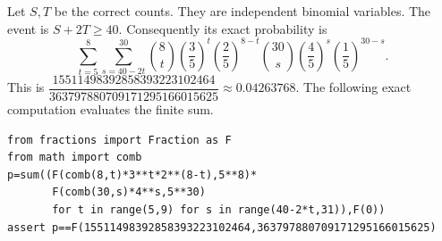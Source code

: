 Let $ S,T $ be the correct counts. They are independent binomial variables. The event is $ S+2T\ge40 $. Consequently its exact probability is \[\sum_{t=5}^{8}\sum_{s=40-2t}^{30}\binom8t\left(\dfrac{3}{5}\right)^t\left(\dfrac{2}{5}\right)^{8-t}\binom{30}s\left(\dfrac{4}{5}\right)^s\left(\dfrac{1}{5}\right)^{30-s}.\]This is $\boxed{\dfrac{15511498392858393223102464}{363797880709171295166015625}}\approx0.04263768 $. The following exact computation evaluates the finite sum.
\begin{verbatim}
from fractions import Fraction as F
from math import comb
p=sum((F(comb(8,t)*3**t*2**(8-t),5**8)*
       F(comb(30,s)*4**s,5**30)
       for t in range(5,9) for s in range(40-2*t,31)),F(0))
assert p==F(15511498392858393223102464,363797880709171295166015625)
\end{verbatim}
